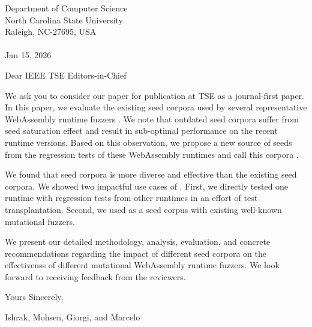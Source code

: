 \documentclass{letter}
\begin{document}
Department of Computer Science\\
North Carolina State University\\
Raleigh, NC-27695, USA\\
\vspace{2pt}\\
Jan 15, 2026

\vspace{10pt}
Dear IEEE TSE Editors-in-Chief

  We ask you to consider our paper for publication at TSE as a journal-first paper. In this paper, we evaluate the existing seed corpora used by several representative WebAssembly runtime fuzzers \cite{zhao2024wapplique, cao2024wasmaker, zhou2023wadiff}. We note that outdated seed corpora suffer from seed saturation effect and result in sub-optimal performance on the recent runtime versions. Based on this observation, we propose a new source of seeds from the regression tests of these WebAssembly runtimes and call this corpora \rtbench{}.
  
  We found that \rtbench{} seed corpora is more diverse and effective than the existing seed corpora. We showed two impactful use cases of \rtbench{}. First, we directly tested one runtime with regression tests from other runtimes in an effort of test transplantation. Second, we used \rtbench{} as a seed corpus with existing well-known mutational fuzzers. 
  
  We present our detailed methodology, analysis, evaluation, and concrete recommendations regarding the impact of different seed corpora on the effectivenss of different mutational WebAssembly runtime fuzzers. We look forward to receiving feedback from the reviewers.  
  

  \vspace{10pt}
  Yours Sincerely,
  
  Ishrak, Mohsen, Giorgi, and Marcelo

\vspace{15pt}


\end{document}
